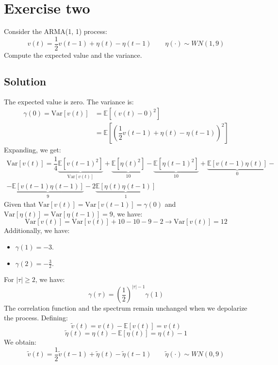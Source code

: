 \section{Exercise two}
Consider the ARMA(1, 1) process:
\[v(t)=\dfrac{1}{2}v(t-1)+\eta(t)-\eta(t-1) \qquad \eta(\cdot)\sim WN(1,9)\]
Compute the expected value and the variance.

\subsection{Solution}
The expected value is zero. 
The variance is:
\begin{align*}
    \gamma(0)=\text{Var}\left[v(t)\right] &= \mathbb{E}\left[(v(t) - 0)^2\right] \\
                                &= \mathbb{E}\left[(\dfrac{1}{2}v(t-1)+\eta(t)-\eta(t-1))^2\right]
\end{align*}
Expanding, we get:
\begin{multline*}
    \text{Var}\left[v(t)\right]= \dfrac{1}{4}\underbrace{\mathbb{E}\left[v(t-1)^2\right]}_{\text{Var}\left[v(t)\right]}  + \underbrace{\mathbb{E}\left[\eta(t)^2\right]}_{10}  -\underbrace{\mathbb{E}\left[\eta(t-1)^2\right]}_{10}  + \underbrace{\mathbb{E}\left[v(t-1)\eta(t)\right]}_{0} - \\ - \underbrace{\mathbb{E}\left[v(t-1)\eta(t-1)\right]}_{9}  - 2 \underbrace{\mathbb{E}\left[\eta(t)\eta(t-1)\right]}_{1}                           
\end{multline*}
Given that $\text{Var}[v(t)] = \text{Var}[v(t-1)] = \gamma(0)$ and $\text{Var}[\eta(t)] = \text{Var}[\eta(t-1)] = 9$, we have:
\[\text{Var}\left[v(t)\right]=\text{Var}\left[v(t)\right]+10-10-9-2\rightarrow\text{Var}\left[v(t)\right]=12\]
Additionally, we have:
\begin{itemize}
    \item $\gamma(1)=-3$. 
    \item $\gamma(2)=-\frac{3}{2}$. 
\end{itemize}
For $|\tau| \geq 2$, we have:
\[\gamma(\tau)=\left( \dfrac{1}{2} \right)^{\left\lvert \tau \right\rvert -1}\gamma(1)\]
The correlation function and the spectrum remain unchanged when we depolarize the process. 
Defining:
\[\tilde{v}(t)=v(t)-\mathbb{E}\left[v(t)\right]=v(t)\]
\[\tilde{\eta}(t)=\eta(t)-\mathbb{E}\left[\eta(t)\right]=\eta(t)-1\]
We obtain:
\[\tilde{v}(t)=\dfrac{1}{2}\tilde{v}(t-1)+\tilde{\eta}(t)-\tilde{\eta}(t-1) \qquad \tilde{\eta}(\cdot)\sim WN(0,9)\]

